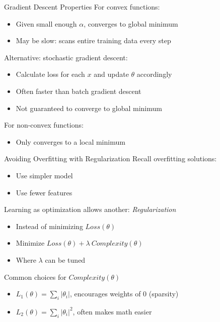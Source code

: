 \documentclass[14pt]{beamer}
\begin{document}
\begin{frame}[label=gradient-descent-properties]{Gradient Descent Properties}
For convex functions:
\begin{itemize}
\item Given small enough $\alpha$, converges to global minimum
\item May be slow: scans entire training data every step
\end{itemize}
\pause
\bigskip
Alternative: stochastic gradient descent:
\begin{itemize}
\item Calculate loss for each $x$ and update $\theta$ accordingly
\item Often faster than batch gradient descent
\item Not guaranteed to converge to global minimum
\end{itemize}
\pause
\bigskip
For non-convex functions:
\begin{itemize}
\item Only converges to a local minimum
\end{itemize}
\end{frame}

\begin{frame}[label=regularization]{Avoiding Overfitting with Regularization}
Recall overfitting solutions:
\pause
\begin{itemize}
\item Use simpler model
\item Use fewer features
\end{itemize}
\pause
Learning as optimization allows another: \emph{Regularization}
\begin{itemize}
\item Instead of minimizing $Loss(\theta)$
\item Minimize $Loss(\theta) + \lambda \: Complexity(\theta)$
\item Where $\lambda$ can be tuned
\end{itemize}
\pause
Common choices for $Complexity(\theta)$
\begin{itemize}
\item $\displaystyle L_1(\theta) = \sum_{i} | \theta_{i} |$, encourages weights of 0 (sparsity)
\item $\displaystyle L_2(\theta) = \sum_{i} | \theta_{i} |^{2}$, often makes math easier
\end{itemize}
\end{frame}
\end{document}
